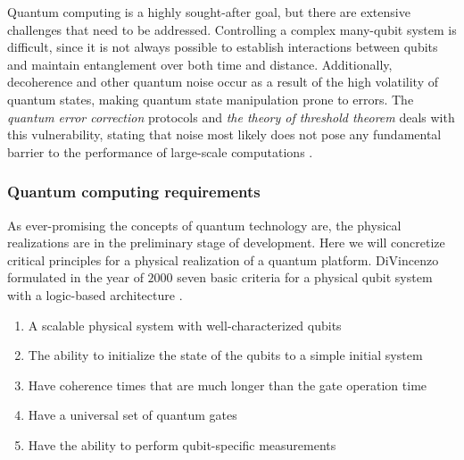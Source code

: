 
Quantum computing is a highly sought-after goal, but there are extensive challenges that need to be addressed. Controlling a complex many-qubit system is difficult, since it is not always possible to establish interactions between qubits \cite{DiVincenzo2000} and maintain entanglement over both time and distance. Additionally, decoherence and other quantum noise occur as a result of the high volatility of quantum states, making quantum state manipulation prone to errors. The \textit{quantum error correction} protocols and \textit{the theory of threshold theorem} \cite{Pavicic2006, Gottesman2009} deals with this vulnerability, stating that noise most likely does not pose any fundamental barrier to the performance of large-scale computations \cite{Pavicic2006}.


\subsubsection{Quantum computing requirements}
As ever-promising the concepts of quantum technology are, the physical realizations are in the preliminary stage of development. Here we will concretize critical principles for a physical realization of a quantum platform. DiVincenzo formulated in the year of $2000$ seven basic criteria for a physical qubit system with a logic-based architecture \cite{DiVincenzo2000}.



\begin{enumerate}
  \item A scalable physical system with well-characterized qubits
  \item The ability to initialize the state of the qubits to a simple initial system
  \item Have coherence times that are much longer than the gate operation time
  \item Have a universal set of quantum gates
  \item Have the ability to perform qubit-specific measurements
\end{enumerate}

